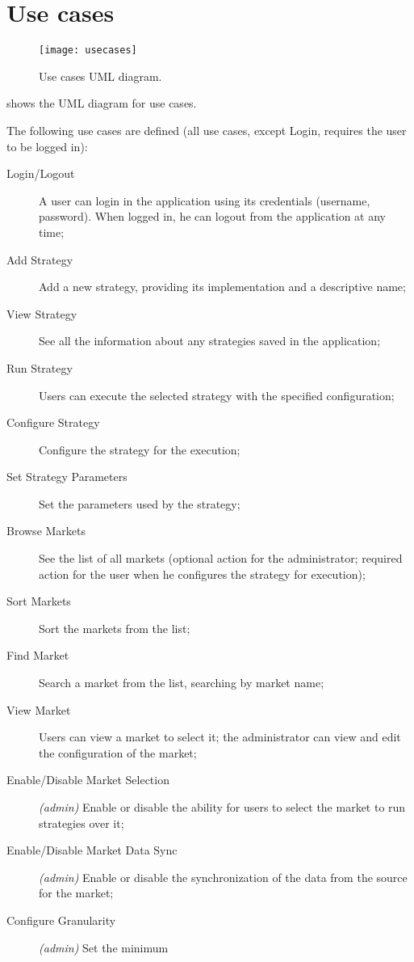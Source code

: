 \chapter{Use cases}\label{ch:usecases}

\begin{figure}[p]
	\texttt{[image: usecases]}
	\caption{Use cases UML diagram.}\label{fig:usecases}
\end{figure}

 shows the UML diagram for use cases.

The following use cases are defined (all use cases, except Login, requires the
user to be logged in):
\begin{description}
	\item[Login/Logout] A user can login in the application using its
		credentials (username, password). When logged in, he can logout
		from the application at any time;
	\item[Add Strategy] Add a new strategy, providing its implementation and
		a descriptive name;
	\item[View Strategy] See all the information about any strategies saved
		in the application;
	\item[Run Strategy] Users can execute the selected strategy with the
		specified configuration;
	\item[Configure Strategy] Configure the strategy for the execution;
	\item[Set Strategy Parameters] Set the parameters used by the strategy;
	\item[Browse Markets] See the list of all markets (optional action for
		the administrator; required action for the user when he
		configures the strategy for execution);
	\item[Sort Markets] Sort the markets from the list;
	\item[Find Market] Search a market from the list, searching by market
		name;
	\item[View Market] Users can view a market to select it; the
		administrator can view and edit the configuration of the market;
	\item[Enable/Disable Market Selection] \textit{(admin)} Enable or
		disable the ability for users to select the market to run
		strategies over it;
	\item[Enable/Disable Market Data Sync] \textit{(admin)} Enable or
		disable the synchronization of the data from the source for the
		market;
	\item[Configure Granularity] \textit{(admin)} Set the minimum

\end{description}
